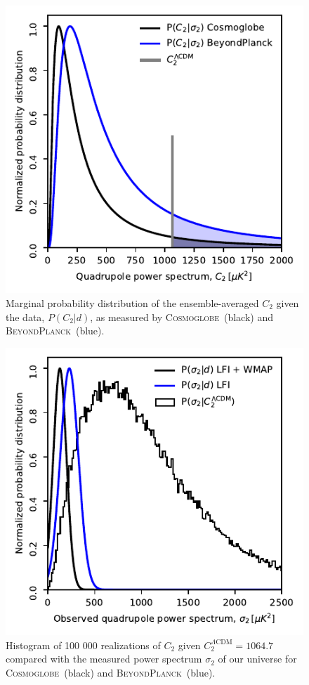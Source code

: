 \documentclass[twocolumn]{../../common/aa}
\newcommand{\BP}{\textsc{BeyondPlanck}}
\newcommand{\Cosmoglobe}{\textsc{Cosmoglobe}}
\begin{document}
\begin{figure}
	\includegraphics[width=\columnwidth]{figures/WMAP_blackwell-rao.pdf}
	\caption{Marginal probability distribution of the ensemble-averaged $C_2$ given the data, $P(C_2|d)$, as measured by \Cosmoglobe\ (black) and \BP\ (blue).}
\end{figure}

\begin{figure}
	\includegraphics[width=\columnwidth]{figures/WMAP_P_sig_d_c.pdf}
	\caption{Histogram of 100 000 realizations of $C_2$ given $C_2^{\Lambda \mathrm{CDM}} = 1064.7$ compared with the measured power spectrum $\sigma_2$ of our universe for \Cosmoglobe\ (black) and \BP\ (blue).}
\end{figure}
\end{document}
